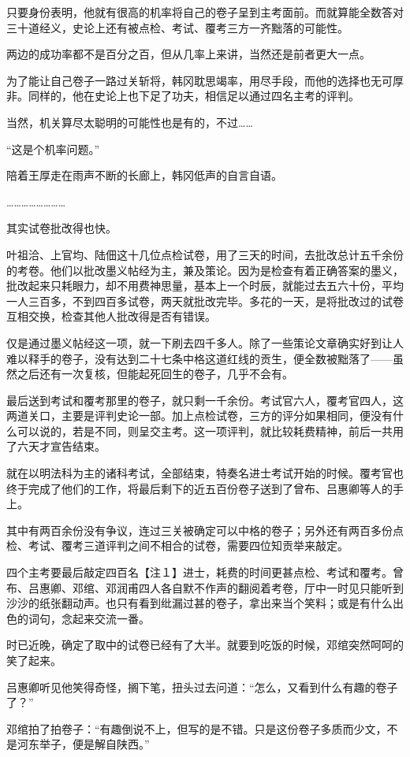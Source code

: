 只要身份表明，他就有很高的机率将自己的卷子呈到主考面前。而就算能全数答对三十道经义，史论上还有被点检、考试、覆考三方一齐黜落的可能性。

两边的成功率都不是百分之百，但从几率上来讲，当然还是前者更大一点。

为了能让自己卷子一路过关斩将，韩冈耽思竭率，用尽手段，而他的选择也无可厚非。同样的，他在史论上也下足了功夫，相信足以通过四名主考的评判。

当然，机关算尽太聪明的可能性也是有的，不过……

“这是个机率问题。”

陪着王厚走在雨声不断的长廊上，韩冈低声的自言自语。

……………………

其实试卷批改得也快。

叶祖洽、上官均、陆佃这十几位点检试卷，用了三天的时间，去批改总计五千余份的考卷。他们以批改墨义帖经为主，兼及策论。因为是检查有着正确答案的墨义，批改起来只耗眼力，却不用费神思量，基本上一个时辰，就能过去五六十份，平均一人三百多，不到四百多试卷，两天就批改完毕。多花的一天，是将批改过的试卷互相交换，检查其他人批改得是否有错误。

仅是通过墨义帖经这一项，就一下刷去四千多人。除了一些策论文章确实好到让人难以释手的卷子，没有达到二十七条中格这道红线的贡生，便全数被黜落了——虽然之后还有一次复核，但能起死回生的卷子，几乎不会有。

最后送到考试和覆考那里的卷子，就只剩一千余份。考试官六人，覆考官四人，这两道关口，主要是评判史论一部。加上点检试卷，三方的评分如果相同，便没有什么可以说的，若是不同，则呈交主考。这一项评判，就比较耗费精神，前后一共用了六天才宣告结束。

就在以明法科为主的诸科考试，全部结束，特奏名进士考试开始的时候。覆考官也终于完成了他们的工作，将最后剩下的近五百份卷子送到了曾布、吕惠卿等人的手上。

其中有两百余份没有争议，连过三关被确定可以中格的卷子；另外还有两百多份点检、考试、覆考三道评判之间不相合的试卷，需要四位知贡举来敲定。

四个主考要最后敲定四百名【注１】进士，耗费的时间更甚点检、考试和覆考。曾布、吕惠卿、邓绾、邓润甫四人各自默不作声的翻阅着考卷，厅中一时见只能听到沙沙的纸张翻动声。也只有看到纰漏过甚的卷子，拿出来当个笑料；或是有什么出色的词句，念起来交流一番。

时已近晚，确定了取中的试卷已经有了大半。就要到吃饭的时候，邓绾突然呵呵的笑了起来。

吕惠卿听见他笑得奇怪，搁下笔，扭头过去问道：“怎么，又看到什么有趣的卷子了？”

邓绾拍了拍卷子：“有趣倒说不上，但写的是不错。只是这份卷子多质而少文，不是河东举子，便是解自陕西。”

